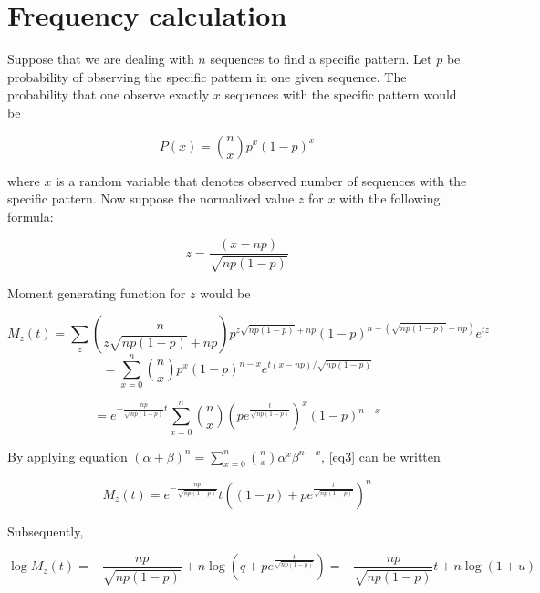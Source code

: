 
\section{Frequency calculation}
\label{stdfreq_proof}

Suppose that we are dealing with \(n\) sequences to find a specific
pattern.  Let \(p\) be probability of observing the specific pattern
in one given sequence. The probability that one observe exactly \(x\) sequences with the specific pattern would be

\begin{equation}
P(x) = {n\choose x}p^{x}(1-p)^{x} 
\label{eq1}
\end{equation}

\noindent
where \(x\) is a random variable that denotes observed number of
sequences with the specific pattern. Now suppose the normalized value
\(z\) for \(x\) with the following formula:

\begin{equation}
z = \frac{(x - np)}{\sqrt{np(1-p)}} 
\end{equation}

\noindent
Moment generating function for \(z\) would be

\[
M_{z}(t) = 
\sum_{z}{n\choose z\sqrt{np(1-p)}+np}p^{z\sqrt{np(1-p)}+np}(1-p)^{n-(\sqrt{np(1-p)}+np)}e^{tz}
\]
\[
 = \sum_{x = 0}^{n}{n\choose x}p^{x}(1-p)^{n-x}e^{t(x-np)/\sqrt{np(1-p)}}
\]

\begin{equation}
 = e^{-\frac{np}{\sqrt{np(1-p)}}t}\sum_{x=0}^{n}{n\choose x}(pe^{\frac{t}{\sqrt{np(1-p)}}})^{x}(1-p)^{n-x}
\label{eq3}
\end{equation}

\noindent 
By applying equation \((\alpha + \beta)^n = \sum_{x=0}^{n}{n\choose x}\alpha^{x}\beta^{n-x}\), \ref{eq3} can be written

\begin{equation}
M_{z}(t) = e^{-\frac{np}{\sqrt{np(1-p)}}}t((1-p) + pe^{\frac{t}{\sqrt{np(1-p)}}})^{n}
\end{equation}

\noindent
Subsequently,

\begin{equation}
\log M_{z}(t) = -\frac{np}{\sqrt{np(1-p)}} + n\log(q + pe^{\frac{t}{\sqrt{np(1-p)}}}) = -\frac{np}{\sqrt{np(1-p)}}t + n\log(1+u)
\label{eq6}
\end{equation}

\vspace{1em}

